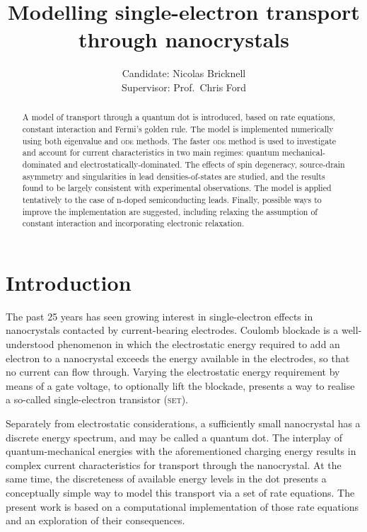 \documentclass[a4paper,11pt]{article}
\title{Modelling single-electron transport\\through nanocrystals}
\author{Candidate: Nicolas Bricknell\\Supervisor: Prof.~Chris Ford}
\begin{document}
    \maketitle
    \begin{abstract}
        \noindent A model of transport through a quantum dot is introduced, based on rate equations, constant interaction and Fermi's golden rule. The model is implemented numerically using both eigenvalue and \textsc{ode} methods. The faster \textsc{ode} method is used to investigate and account for current characteristics in two main regimes: quantum mechanical-dominated and electrostatically-dominated. The effects of spin degeneracy, source-drain asymmetry and singularities in lead densities-of-states are studied, and the results found to be largely consistent with experimental observations. The model is applied tentatively to the case of n-doped semiconducting leads. Finally, possible ways to improve the implementation are suggested, including relaxing the assumption of constant interaction and incorporating electronic relaxation.
    \end{abstract}

    \newpage
    \tableofcontents


    \newpage
    \section{Introduction}
    The past 25 years has seen growing interest in single-electron effects in nanocrystals contacted by current-bearing electrodes. Coulomb blockade is a well-understood phenomenon in which the electrostatic energy required to add an electron to a nanocrystal exceeds the energy available in the electrodes, so that no current can flow through. Varying the electrostatic energy requirement by means of a gate voltage, to optionally lift the blockade, presents a way to realise a so-called single-electron transistor (\textsc{set}).

    Separately from electrostatic considerations, a sufficiently small nanocrystal has a discrete energy spectrum, and may be called a quantum dot. The interplay of quantum-mechanical energies with the aforementioned charging energy results in complex current characteristics for transport through the nanocrystal. At the same time, the discreteness of available energy levels in the dot presents a conceptually simple way to model this transport via a set of rate equations. The present work is based on a computational implementation of those rate equations and an exploration of their consequences.
\end{document}
